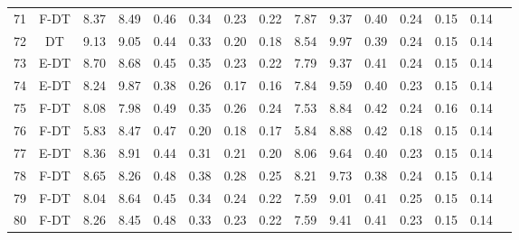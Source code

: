 \begin{longtable}{@{\hskip3pt}c@{\hskip3pt}c@{\hskip3pt}c@{\hskip3pt}c@{\hskip3pt}c@{\hskip3pt}c@{\hskip3pt}c@{\hskip3pt}c@{\hskip3pt}c@{\hskip3pt}c@{\hskip3pt}c@{\hskip3pt}c@{\hskip3pt}c@{\hskip3pt}c@{\hskip3pt}c}
         71 &           F-DT &              8.37 &        8.49 &          0.46 &        0.34 &        0.23 &         0.22 &                7.87 &        9.37 &          0.40 &        0.24 &        0.15 &         0.14 \\
         72 &             DT &              9.13 &        9.05 &          0.44 &        0.33 &        0.20 &         0.18 &                8.54 &        9.97 &          0.39 &        0.24 &        0.15 &         0.14 \\
         73 &           E-DT &              8.70 &        8.68 &          0.45 &        0.35 &        0.23 &         0.22 &                7.79 &        9.37 &          0.41 &        0.24 &        0.15 &         0.14 \\
         74 &           E-DT &              8.24 &        9.87 &          0.38 &        0.26 &        0.17 &         0.16 &                7.84 &        9.59 &          0.40 &        0.23 &        0.15 &         0.14 \\
         75 &           F-DT &              8.08 &        7.98 &          0.49 &        0.35 &        0.26 &         0.24 &                7.53 &        8.84 &          0.42 &        0.24 &        0.16 &         0.14 \\
         76 &           F-DT &              5.83 &        8.47 &          0.47 &        0.20 &        0.18 &         0.17 &                5.84 &        8.88 &          0.42 &        0.18 &        0.15 &         0.14 \\
         77 &           E-DT &              8.36 &        8.91 &          0.44 &        0.31 &        0.21 &         0.20 &                8.06 &        9.64 &          0.40 &        0.23 &        0.15 &         0.14 \\
         78 &           F-DT &              8.65 &        8.26 &          0.48 &        0.38 &        0.28 &         0.25 &                8.21 &        9.73 &          0.38 &        0.24 &        0.15 &         0.14 \\
         79 &           F-DT &              8.04 &        8.64 &          0.45 &        0.34 &        0.24 &         0.22 &                7.59 &        9.01 &          0.41 &        0.25 &        0.15 &         0.14 \\
         80 &           F-DT &              8.26 &        8.45 &          0.48 &        0.33 &        0.23 &         0.22 &                7.59 &        9.41 &          0.41 &        0.23 &        0.15 &         0.14 \\

\end{longtable}
